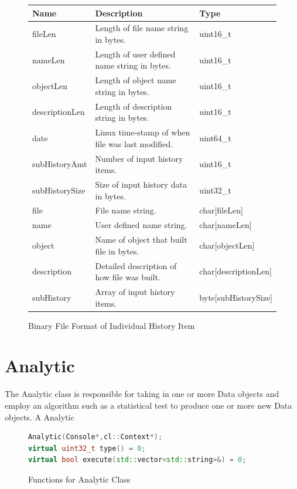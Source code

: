 \documentclass[10pt]{article}
\begin{document}
\begin{figure}[H]
\begin{mdframed}[style=btable]
\begin{tabularx}{\textwidth}{|l|X|l|}
\hline
\textbf{Name} & \textbf{Description} & \textbf{Type} \\
\hline
fileLen & Length of file name string in bytes. & uint16\_t \\
\hline
nameLen & Length of user defined name string in bytes. & uint16\_t \\
\hline
objectLen & Length of object name string in bytes. & uint16\_t \\
\hline
descriptionLen & Length of description string in bytes. & uint16\_t \\
\hline
date & Linux time-stamp of when file was last modified. & uint64\_t \\
\hline
subHistoryAmt & Number of input history items. & uint16\_t \\
\hline
subHistorySize & Size of input history data in bytes. & uint32\_t \\
\hline
file & File name string. & char[fileLen] \\
\hline
name & User defined name string. & char[nameLen] \\
\hline
object & Name of object that built file in bytes. & char[objectLen] \\
\hline
description & Detailed description of how file was built. & 
char[descriptionLen] \\
\hline
subHistory & Array of input history items. & byte[subHistorySize] \\
\hline
\end{tabularx}
\end{mdframed}
\caption{Binary File Format of Individual History Item}
\label{fig:kincdata:history}
\end{figure}

\newpage
\section{Analytic}

The Analytic class is responsible for taking in one or more Data objects
and employ an algorithm such as a statistical test to produce one or more 
new Data objects.   A Analytic 

\begin{figure}[H]
\begin{mdframed}[style=functions]
\begin{lstlisting}[language=C++]
Analytic(Console*,cl::Context*);
virtual uint32_t type() = 0;
virtual bool execute(std::vector<std::string>&) = 0;
\end{lstlisting}
\end{mdframed}
\caption{Functions for Analytic Class}
\label{fig:kincanalytic}
\end{figure}
\end{document}
